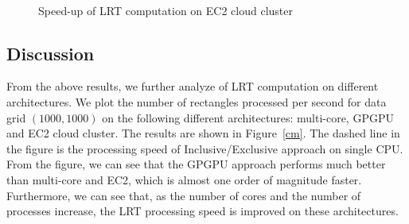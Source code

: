 \documentclass[AMA,LATO1COL]{WileyNJD-v2}
\begin{document}
\begin{figure}[h]
\centering
{}
~~
\caption{Speed-up of LRT computation on EC2 cloud cluster }\label{ec2}
\end{figure}

\subsection{Discussion}
From the above results, we further analyze of LRT computation on different architectures. We plot the number of rectangles processed per second for data grid $(1000,1000)$ on the following different architectures: multi-core, GPGPU and EC2 cloud cluster. The results are shown in Figure~\ref{cm}. The dashed line in the figure is the processing speed of Inclusive/Exclusive approach on single CPU. From the figure, we can see that the GPGPU approach performs much better than multi-core and EC2, which is almost one order of magnitude faster. Furthermore, we can see that, as the number of cores and the number of processes increase, the LRT processing speed is improved on these architectures. \\
\end{document}
